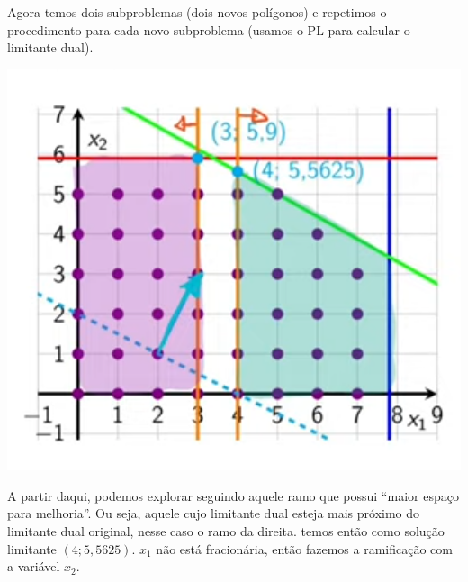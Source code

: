 Agora temos dois subproblemas (dois novos polígonos) e repetimos o procedimento para cada novo subproblema (usamos o PL para calcular o limitante dual).

\begin{multicols}{2}

    \null \vfill
    \begin{center}
    \end{center}
    \vfill \null

    \columnbreak

    \includegraphics[width=.45\textwidth]{img/ex_branch_bound_2.png}
\end{multicols}

A partir daqui, podemos explorar seguindo aquele ramo que possui ``maior espaço para melhoria''. Ou seja, aquele cujo limitante dual esteja mais próximo do limitante dual original, nesse caso o ramo da direita. temos então como solução limitante $(4; 5,5625)$. $x_1$ não está fracionária, então fazemos a ramificação com a variável $x_2$.

\begin{center}
\end{center}

